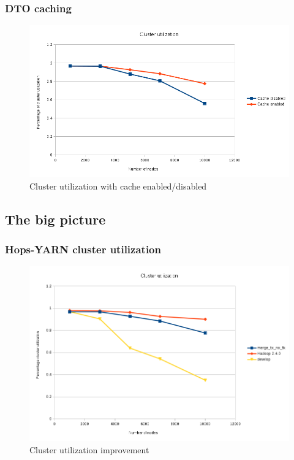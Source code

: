 \documentclass{beamer}
\begin{document}
\begin{frame}
\frametitle{DTO caching}

\begin{figure}
\centering
\includegraphics[scale=0.48]{resources/cluster_util_cache_en_di.png}
\caption{Cluster utilization with cache enabled/disabled}
\end{figure}
\end{frame}

\subsection{The big picture}

\begin{frame}
\frametitle{Hops-YARN cluster utilization}

\begin{figure}
\centering
\includegraphics[scale=0.4]{resources/hopsyarn_cluster_util.png}
\caption{Cluster utilization improvement}
\end{figure}
\end{frame}
\end{document}
